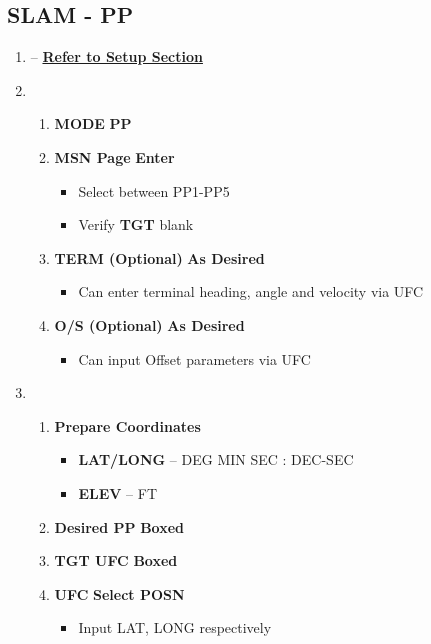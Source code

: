 \documentclass[fontInter]{TechCheck}
\begin{document}
	\subsection{SLAM - PP}
	\begin{enumerate}[leftmargin=0.1\textwidth, rightmargin=0.1\textwidth, itemsep=4pt, label=\textbf{\arabic*.}]
		\item {} -- \hyperref[subsec:slamsetup]{\textbf{Refer to Setup Section}}
		\item {}
		\begin{enumerate}[itemsep=4pt]
			\item \textbf{MODE} \dotfill \textbf{PP}
			\item \textbf{MSN Page} \dotfill \textbf{Enter}
			\begin{itemize}
				\item Select between PP1-PP5
				\item Verify \textbf{TGT} blank
			\end{itemize}
			\item \textbf{TERM (Optional)} \dotfill \textbf{As Desired}
			\begin{itemize}
				\item Can enter terminal heading, angle and velocity via UFC
			\end{itemize}
			\item \textbf{O/S (Optional)} \dotfill \textbf{As Desired}
			\begin{itemize}
				\item Can input Offset parameters via UFC
			\end{itemize}
		\end{enumerate}
		\item {}
		\begin{enumerate}[itemsep=4pt]
			\item \textbf{Prepare Coordinates}
			\begin{itemize}
				\item \textbf{LAT/LONG} -- DEG MIN SEC : DEC-SEC
				\item \textbf{ELEV} -- FT
			\end{itemize}
			\item \textbf{Desired PP} \dotfill \textbf{Boxed}
			\item \textbf{TGT UFC} \dotfill \textbf{Boxed}
			\item \textbf{UFC} \dotfill \textbf{Select POSN}
			\begin{itemize}
				\item Input LAT, LONG respectively

\end{itemize}
\end{enumerate}
\end{enumerate}
\end{document}
